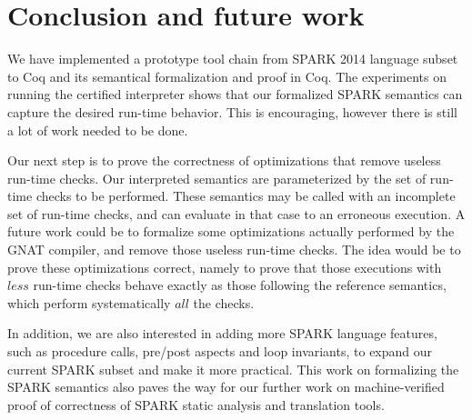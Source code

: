 \section{Conclusion and future work}
We have implemented a prototype tool chain from SPARK 2014 language subset to
Coq and its semantical formalization and proof in Coq. The experiments on running the certified 
interpreter shows that our formalized SPARK semantics can capture the desired run-time behavior.
This is encouraging, however there is still a lot of work needed to be done.

Our next step is to prove the correctness of optimizations that remove 
useless run-time checks. 
Our interpreted semantics are parameterized by the set of run-time 
checks to be performed. These semantics may be called with an 
incomplete set of run-time checks, and can evaluate in that case to an 
erroneous execution. A future work could be to formalize some 
optimizations actually performed by the GNAT compiler, and remove those useless 
run-time checks. The idea would be to prove 
these optimizations correct, namely to prove that those executions 
with $\mathit{less}$ run-time checks behave exactly as those following the 
reference semantics, which perform systematically $\mathit{all}$ the checks. 

In addition, we are also interested in adding more SPARK language features, 
such as procedure calls, pre/post aspects and loop invariants, to expand our
current SPARK subset and make it more practical. This work on formalizing the SPARK semantics
also paves the way for our further work on machine-verified proof of correctness of
SPARK static analysis and translation tools.
